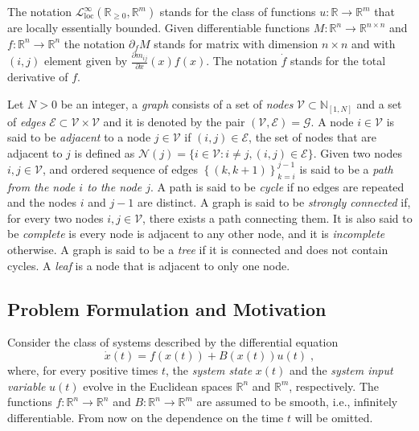 \documentclass[10pt,twocolumn,twoside]{IEEEtran}
\theoremstyle{plain}
\theoremstyle{definition}
\theoremstyle{remark}
\begin{document}
The notation $\mathcal{L}_{\mathrm{loc}}^\infty(\mathbb{R}_{\geq0},\mathbb{R}^m)$ stands for the class of functions $u:\mathbb{R}\to\mathbb{R}^m$ that are locally essentially bounded. Given differentiable functions $M:\mathbb{R}^n\to\mathbb{R}^{n\times n}$ and $f:\mathbb{R}^n\to\mathbb{R}^n$ the notation $\partial_fM$ stands for matrix with dimension $n\times n$ and with $(i,j)$ element given by $\frac{\partial m_{ij}}{\partial x}(x)f(x)$. The notation $\dot{f}$ stands for the total derivative of $f$.

Let $N>0$ be an integer, a \emph{graph} consists of a set of \emph{nodes} $\mathscr{V}\subset\mathbb{N}_{[1,N]}$ and a set of \emph{edges} $\mathscr{E}\subset\mathscr{V}\times\mathscr{V}$ and it is denoted by the pair $(\mathscr{V},\mathscr{E})=\mathscr{G}$. A node $i\in\mathscr{V}$ is said to be \emph{adjacent} to a node $j\in\mathscr{V}$ if $(i,j)\in\mathscr{E}$, the set of nodes that are adjacent to $j$ is defined as $\mathscr{N}(j)=\{i\in\mathscr{V}:i\neq j,(i,j)\in\mathscr{E}\}$. Given two nodes $i,j\in\mathscr{V}$, and ordered sequence of edges $\left\{(k,k+1)\right\}_{k=i}^{j-1}$ is said to be a \emph{path from the node $i$ to the node $j$}. A path is said to be \emph{cycle} if no edges are repeated and the nodes $i$ and $j-1$  are distinct. A graph is said to be \emph{strongly connected} if, for every two nodes $i,j\in\mathscr{V}$, there exists a path connecting them. It is also said to be \emph{complete} is every node is adjacent to any other node, and it is \emph{incomplete} otherwise. A graph is said to be a \emph{tree} if it is connected and does not contain cycles. A \emph{leaf} is a node that is adjacent to only one node.


\subsection{Problem Formulation and Motivation}\label{sec:Problem Formulation and Motivation}

Consider the class of systems described by the differential equation
\begin{equation}\label{eq:general system}
	\dot{x}(t)=f(x(t))+B(x(t))u(t)\;,	
\end{equation}
where, for every positive times $t$, the \emph{system state} $x(t)$ and the \emph{system input variable} $u(t)$ evolve in the Euclidean spaces $\mathbb{R}^n$ and $\mathbb{R}^m$, respectively. The functions $f:\mathbb{R}^n\to\mathbb{R}^n$ and $B:\mathbb{R}^n\to\mathbb{R}^m$ are assumed to be smooth, i.e., infinitely differentiable. From now on the dependence on the time $t$ will be omitted.
\end{document}
